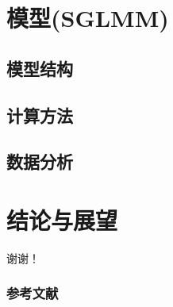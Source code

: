 \documentclass[11pt,compress,xcolor=x11names,UTF8]{beamer}
\begin{document}
\section{模型(SGLMM)}

\subsection{模型结构}

\subsection{计算方法}

\subsection{数据分析}

\section{结论与展望}



\begin{frame}

  \centerline{\Huge\color{red} 谢谢！ }

\end{frame}



\begin{frame}[allowframebreaks]
\frametitle{参考文献}


\end{frame}
\end{document}
